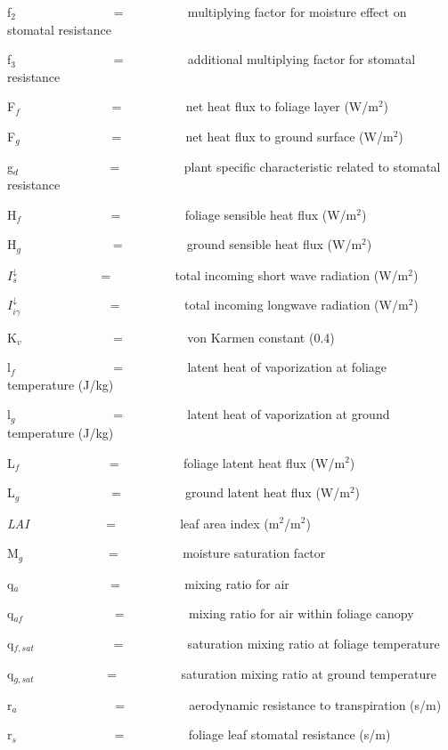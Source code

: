 f\(_{2}\)~~~~~~~~~~~~~~~ = ~~~~~~~~~ multiplying factor for moisture effect on stomatal resistance

f\(_{3}\)~~~~~~~~~~~~~~~ = ~~~~~~~~~ additional multiplying factor for stomatal resistance

F\(_{f}\)~~~~~~~~~~~~~~ = ~~~~~~~~~ net heat flux to foliage layer (W/m\(^{2}\))

F\(_{g}\)~~~~~~~~~~~~~~ = ~~~~~~~~~ net heat flux to ground surface (W/m\(^{2}\))

g\(_{d}\)~~~~~~~~~~~~~~ = ~~~~~~~~~ plant specific characteristic related to stomatal resistance

H\(_{f}\) ~~~~~~~~~~~~~ = ~~~~~~~~~ foliage sensible heat flux (W/m\(^{2}\))

H\(_{g}\)~~~~~~~~~~~~~~ = ~~~~~~~~~ ground sensible heat flux (W/m\(^{2}\))

\(I_s^ \downarrow\) ~~~~~~~~~~~~ = ~~~~~~~~~ total incoming short wave radiation (W/m\(^{2}\))

\(I_{i\gamma }^ \downarrow\) ~~~~~~~~~~~~~ = ~~~~~~~~~ total incoming longwave radiation (W/m\(^{2}\))

K\(_{v}\)~~~~~~~~~~~~~~ = ~~~~~~~~~ von Karmen constant (0.4)

l\(_{f}\)~~~~~~~~~~~~~~~ = ~~~~~~~~~ latent heat of vaporization at foliage temperature (J/kg)

l\(_{g}\)~~~~~~~~~~~~~~~ = ~~~~~~~~~ latent heat of vaporization at ground temperature (J/kg)

L\emph{\(_{f}\)}~ ~~~~~~~~~~~~ = ~~~~~~~~~ foliage latent heat flux (W/m\(^{2}\))

L\(_{g}\)~~~~~~~~~~~~~~ = ~~~~~~~~~ ground latent heat flux (W/m\(^{2}\))

\emph{LAI}~ ~~~~~~~~~~ = ~~~~~~~~~ leaf area index (m\(^{2}\)/m\(^{2}\))

M\(_{g}\)~~~~~~~~~~~~~ = ~~~~~~~~~ moisture saturation factor

q\(_{a}\)~~~~~~~~~~~~~~ = ~~~~~~~~~ mixing ratio for air

q\(_{af}\)~~~~~~~~~~~~~~ = ~~~~~~~~~ mixing ratio for air within foliage canopy

q\(_{f,sat}\)~~~~~~~~~~~~ = ~~~~~~~~~ saturation mixing ratio at foliage temperature

q\(_{g,sat}\)~~~~~~~~~~~ = ~~~~~~~~~ saturation mixing ratio at ground temperature

r\(_{a}\)~~~~~~~~~~~~~~~ = ~~~~~~~~~ aerodynamic resistance to transpiration (s/m)

r\(_{s}\)~~~~~~~~~~~~~~~ = ~~~~~~~~~ foliage leaf stomatal resistance (s/m)

